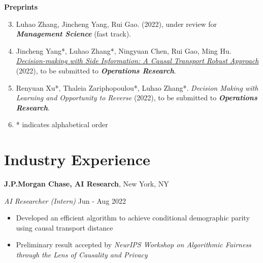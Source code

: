\documentclass[margin,line]{res}
\newcommand{\MYhref}[3][airforceblue]{\href{#2}{\color{#1}{#3}}}%
\begin{document}
\begin{resume}
{\bf Preprints}
\begin{enumerate}[leftmargin=0.15in]
\setcounter{enumi}{2}
    \item Luhao Zhang, Jincheng Yang, Rui Gao. \textit{\MYhref{https://arxiv.org/abs/2205.00362}{A Simple and General Duality Proof for Wasserstein Distributionally Robust Optimization}} (2022), under review for \textbf{\textit{Management Science}} (fast track).
    \item Jincheng Yang*, Luhao Zhang*, Ningyuan Chen, Rui Gao, Ming Hu. \textit{\href{https://optimization-online.org/2022/10/decision-making-with-side-information-a-causal-transport-robust-approach/}{Decision-making with Side Information: A Causal Transport Robust Approach}} (2022), to be submitted to \textbf{\textit{Operations Research}}.
    \item Renyuan Xu*, Thaleia Zariphopoulou*, Luhao Zhang*. \textit{Decision Making with Learning and Opportunity to Reverse} (2022), to be submitted to \textbf{\textit{Operations Research}}.
    \item[] * indicates alphabetical order
\end{enumerate}



\section{\sc Industry Experience}
{\bf J.P.Morgan Chase, AI Research}, New York, NY
\vspace{-.3cm}

{\em AI Researcher (Intern)} \hfill { Jun - Aug 2022}
\begin{itemize}[leftmargin=0.15in]
\item Developed an efficient algorithm to achieve conditional demographic parity using causal transport distance
\item Preliminary result accepted by \textit{NeurIPS Workshop on Algorithmic Fairness through the Lens of Causality and Privacy}
\end{itemize}






\end{resume}
\end{document}
